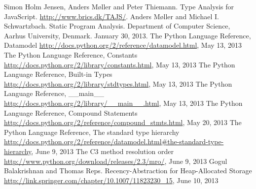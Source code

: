 \begin{thebibliography}{8}

 Simon Holm Jensen, Anders M\o ller and Peter Thiemann. Type Analysis for JavaScript. \url{http://www.brics.dk/TAJS/}.
 Anders M\o ller and Michael I. Schwartzbach. Static Program Analysis. Department of Computer Science, Aarhus University, Denmark. January 30, 2013.
 The Python Language Reference, Datamodel \url{http://docs.python.org/2/reference/datamodel.html}, May 13, 2013
 The Python Language Reference, Constants \url{http://docs.python.org/2/library/constants.html}, May 13, 2013
 The Python Language Reference, Built-in Types \url{http://docs.python.org/2/library/stdtypes.html}, May 13, 2013
 The Python Language Reference, \_\_main\_\_ \url{http://docs.python.org/2/library/__main__.html}, May 13, 2013
 The Python Language Reference, Compound Statements \url{http://docs.python.org/2/reference/compound_stmts.html}, May 20, 2013
 The Python Language Reference, The standard type hierarchy \url{http://docs.python.org/2/reference/datamodel.html#the-standard-type-hierarchy}, June 9, 2013
 The C3 method resolution order \url{http://www.python.org/download/releases/2.3/mro/}, June 9, 2013
 Gogul Balakrishnan and Thomas Reps. Recency-Abstraction for Heap-Allocated Storage \url{http://link.springer.com/chapter/10.1007/11823230_15}, June 10, 2013
	
\end{thebibliography}
